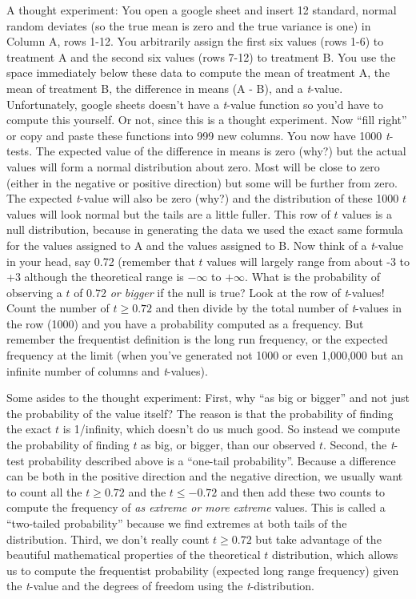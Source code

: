 \documentclass[]{book}
\begin{document}
A thought experiment: You open a google sheet and insert 12 standard,
normal random deviates (so the true mean is zero and the true variance
is one) in Column A, rows 1-12. You arbitrarily assign the first six
values (rows 1-6) to treatment A and the second six values (rows 7-12)
to treatment B. You use the space immediately below these data to
compute the mean of treatment A, the mean of treatment B, the difference
in means (A - B), and a \emph{t}-value. Unfortunately, google sheets
doesn't have a \emph{t}-value function so you'd have to compute this
yourself. Or not, since this is a thought experiment. Now ``fill right''
or copy and paste these functions into 999 new columns. You now have
1000 \emph{t}-tests. The expected value of the difference in means is
zero (why?) but the actual values will form a normal distribution about
zero. Most will be close to zero (either in the negative or positive
direction) but some will be further from zero. The expected
\emph{t}-value will also be zero (why?) and the distribution of these
1000 \(t\) values will look normal but the tails are a little fuller.
This row of \(t\) values is a null distribution, because in generating
the data we used the exact same formula for the values assigned to A and
the values assigned to B. Now think of a \emph{t}-value in your head,
say 0.72 (remember that \(t\) values will largely range from about -3 to
+3 although the theoretical range is \(-\infty\) to \(+\infty\). What is
the probability of observing a \(t\) of 0.72 \emph{or bigger} if the
null is true? Look at the row of \emph{t}-values! Count the number of
\(t \ge 0.72\) and then divide by the total number of \emph{t}-values in
the row (1000) and you have a probability computed as a frequency. But
remember the frequentist definition is the long run frequency, or the
expected frequency at the limit (when you've generated not 1000 or even
1,000,000 but an infinite number of columns and \emph{t}-values).

Some asides to the thought experiment: First, why ``as big or bigger''
and not just the probability of the value itself? The reason is that the
probability of finding the exact \(t\) is 1/infinity, which doesn't do
us much good. So instead we compute the probability of finding \(t\) as
big, or bigger, than our observed \(t\). Second, the \emph{t}-test
probability described above is a ``one-tail probability''. Because a
difference can be both in the positive direction and the negative
direction, we usually want to count all the \(t \ge 0.72\) and the
\(t \le -0.72\) and then add these two counts to compute the frequency
of \emph{as extreme or more extreme} values. This is called a
``two-tailed probability'' because we find extremes at both tails of the
distribution. Third, we don't really count \(t \ge 0.72\) but take
advantage of the beautiful mathematical properties of the theoretical
\(t\) distribution, which allows us to compute the frequentist
probability (expected long range frequency) given the \emph{t}-value and
the degrees of freedom using the \emph{t}-distribution.
\end{document}
